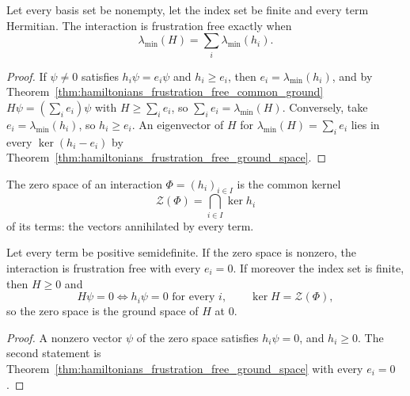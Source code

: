 \begin{theorem}
    \label{thm:hamiltonians_frustration_free_least_eigenvalue}
    \leanok
    Let every basis set be nonempty, let the index set be finite and every term
    Hermitian. The interaction is frustration free exactly when
    \[
        \lambda_{\min}(H)=\sum_i\lambda_{\min}(h_i).
    \]
\end{theorem}
\begin{proof}\leanok
    If $\psi\ne0$ satisfies $h_i\psi=e_i\psi$ and $h_i\ge e_i$, then
    $e_i=\lambda_{\min}(h_i)$, and by
    Theorem~\ref{thm:hamiltonians_frustration_free_common_ground}
    $H\psi=(\sum_ie_i)\psi$ with $H\ge\sum_ie_i$, so $\sum_ie_i=\lambda_{\min}(H)$.
    Conversely, take $e_i=\lambda_{\min}(h_i)$, so $h_i\ge e_i$. An eigenvector of
    $H$ for $\lambda_{\min}(H)=\sum_ie_i$ lies in every $\ker(h_i-e_i)$ by
    Theorem~\ref{thm:hamiltonians_frustration_free_ground_space}.
\end{proof}

\begin{definition}
    \label{def:hamiltonians_zero_space}
    \leanok
    The zero space of an interaction $\Phi=(h_i)_{i\in I}$ is the common kernel
    \[
        \mathcal Z(\Phi)=\bigcap_{i\in I}\ker h_i
    \]
    of its terms: the vectors annihilated by every term.
\end{definition}

\begin{theorem}
    \label{thm:hamiltonians_frustration_free_positive}
    \leanok
    Let every term be positive semidefinite. If the zero space is nonzero, the
    interaction is frustration free with every $e_i=0$. If moreover the index set is
    finite, then $H\ge0$ and
    \[
        H\psi=0\iff h_i\psi=0\text{ for every }i,\qquad
        \ker H=\mathcal Z(\Phi),
    \]
    so the zero space is the ground space of $H$ at $0$.
\end{theorem}
\begin{proof}\leanok
    A nonzero vector $\psi$ of the zero space satisfies $h_i\psi=0$, and $h_i\ge0$.
    The second statement is
    Theorem~\ref{thm:hamiltonians_frustration_free_ground_space} with every
    $e_i=0$.
\end{proof}

